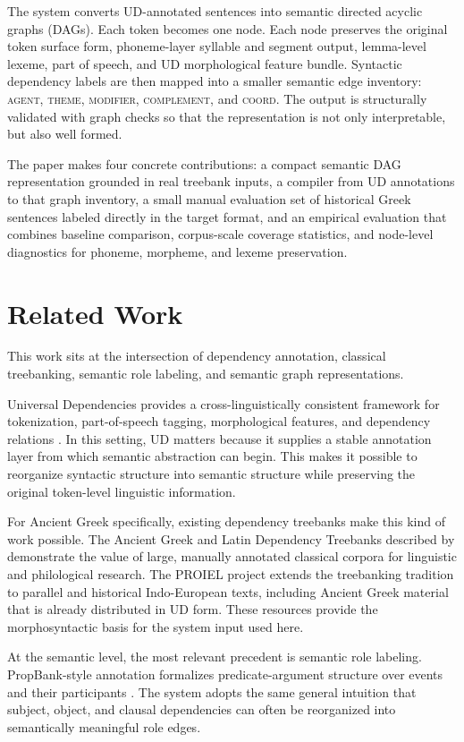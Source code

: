 \documentclass[11pt]{article}
\begin{document}
The system converts UD-annotated sentences into semantic directed acyclic graphs
(DAGs). Each token becomes one node. Each node preserves the original token
surface form, phoneme-layer syllable and segment output, lemma-level lexeme,
part of speech, and UD morphological feature bundle. Syntactic dependency labels
are then mapped into a smaller semantic edge
inventory:
\textsc{agent}, \textsc{theme}, \textsc{modifier}, \textsc{complement}, and
\textsc{coord}. The output is structurally validated with graph checks so that
the representation is not only interpretable, but also well formed.

The paper makes four concrete contributions: a compact semantic DAG
representation grounded in real treebank inputs, a compiler from UD annotations
to that graph inventory, a small manual evaluation set of historical Greek
sentences labeled directly in the target format, and an empirical evaluation
that combines baseline comparison, corpus-scale coverage statistics, and
node-level diagnostics for phoneme, morpheme, and lexeme preservation.

\section{Related Work}
This work sits at the intersection of dependency annotation, classical
treebanking, semantic role labeling, and semantic graph representations.

Universal Dependencies provides a cross-linguistically consistent framework for
tokenization, part-of-speech tagging, morphological features, and dependency
relations \citep{nivre2016ud}. In this setting, UD matters because it supplies a
stable annotation layer from which semantic abstraction can begin. This makes it
possible to reorganize syntactic structure into semantic structure while preserving
the original token-level linguistic information.

For Ancient Greek specifically, existing dependency treebanks make this kind of
work possible. The Ancient Greek and Latin Dependency Treebanks described by
\citet{bamman2011agldt} demonstrate the value of large, manually annotated
classical corpora for linguistic and philological research. The PROIEL project
\citep{haug2008proiel} extends the treebanking tradition to parallel and
historical Indo-European texts, including Ancient Greek material that is already
distributed in UD form. These resources provide the morphosyntactic basis for
the system input used here.

At the semantic level, the most relevant precedent is semantic role labeling.
PropBank-style annotation formalizes predicate-argument structure over events and
their participants \citep{palmer2005propbank}. The system adopts the
same general intuition that subject, object, and clausal dependencies can often
be reorganized into semantically meaningful role edges.
\end{document}
